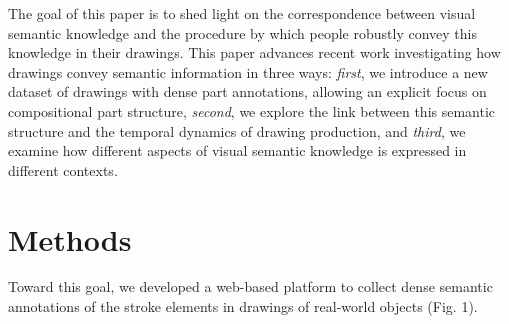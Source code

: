 \documentclass[10pt,letterpaper]{article}
\begin{document}

The goal of this paper is to shed light on the correspondence between visual semantic knowledge and the procedure by which people robustly convey this knowledge in their drawings.
This paper advances recent work \cite{FanCommon2018} investigating how drawings convey semantic information in three ways: 
\textit{first}, we introduce a new dataset of drawings with dense part annotations, allowing an explicit focus on compositional part structure,
\textit{second}, we explore the link between this semantic structure and the temporal dynamics of drawing production,
and \textit{third}, we examine how different aspects of visual semantic knowledge is expressed in different contexts. 


\section{Methods}

Toward this goal, we developed a web-based platform \cite{deLeeuw2015} to collect dense semantic annotations of the stroke elements in drawings of real-world objects (Fig. 1).
\end{document}
